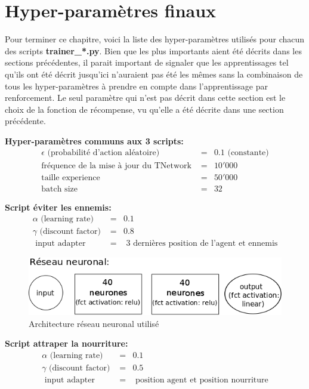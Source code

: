 \documentclass[11pt,a4paper]{report}
\begin{document}
   
   
  \section{Hyper-paramètres finaux}
  
  \par Pour terminer ce chapitre, voici la liste des hyper-paramètres utilisés pour chacun des scripts \textbf{trainer\_*.py}. Bien que les plus importants aient été décrits dans les sections précédentes, il parait important de signaler que les apprentissages tel qu'ils ont été décrit jusqu'ici n'auraient pas été les mêmes sans la combinaison de tous les hyper-paramètres à prendre en compte dans l'apprentissage par renforcement. Le seul paramètre qui n'est pas décrit dans cette section est le choix de la fonction de récompense, vu qu'elle a été décrite dans une section précédente. 
  
   \textbf{Hyper-paramètres communs aux 3 scripts:}   
   \begin{eqnarray}
   \epsilon \text{ (probabilité d'action aléatoire) } &=& 0.1 \text{ (constante)} \\
   \text{fréquence de la mise à jour du TNetwork } &=& 10'000 \\
   \text{taille experience } &=& 50'000 \\
   \text{batch size } &=& 32 
   \end{eqnarray}
   
   \textbf{Script éviter les ennemis:}
   \begin{eqnarray}
   \alpha \text{ (learning rate) } &=& 0.1 \\
   \gamma \text{ (discount factor) } &=& 0.8 \\
   \text{ input adapter } &=& \text{ 3 dernières position de l'agent et ennemis}
   \end{eqnarray}   
   
   \begin{figure}[!h]
   \center
   \includegraphics[scale=0.45]{ressources/nn_model.png}
   \caption{Architecture réseau neuronal utilisé}
   \end{figure} 
   
   
   \textbf{Script attraper la nourriture:}
   \begin{eqnarray}
   \alpha \text{ (learning rate) } &=& 0.1 \\
   \gamma \text{ (discount factor) } &=& 0.5 \\
   \text{ input adapter } &=& \text{ position agent et position nourriture}
   \end{eqnarray}   
   
\end{document}
